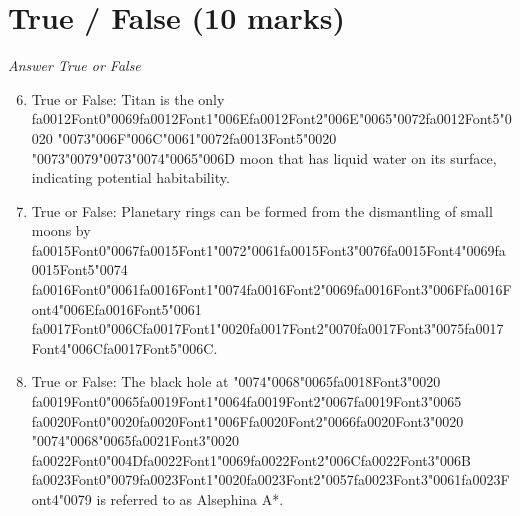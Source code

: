 \documentclass[12pt]{article}
\begin{document}
\section*{True / False (10 marks)}
\textit{Answer True or False}
\begin{enumerate}[label=\arabic*.]
\setcounter{enumi}{5}
\item True or False: Titan is the only {\csname fa0012Font0\endcsname\char"0069}{\csname fa0012Font1\endcsname\char"006E}{\csname fa0012Font2\endcsname\char"006E}{\char"0065}{\char"0072}{\csname fa0012Font5\endcsname\char"0020} {\char"0073}{\char"006F}{\char"006C}{\char"0061}{\char"0072}{\csname fa0013Font5\endcsname\char"0020} {\char"0073}{\char"0079}{\char"0073}{\char"0074}{\char"0065}{\char"006D} moon that has liquid water on its surface, indicating potential habitability.
\item True or False: Planetary rings can be formed from the dismantling of small moons by {\csname fa0015Font0\endcsname\char"0067}{\csname fa0015Font1\endcsname\char"0072}{\char"0061}{\csname fa0015Font3\endcsname\char"0076}{\csname fa0015Font4\endcsname\char"0069}{\csname fa0015Font5\endcsname\char"0074} {\csname fa0016Font0\endcsname\char"0061}{\csname fa0016Font1\endcsname\char"0074}{\csname fa0016Font2\endcsname\char"0069}{\csname fa0016Font3\endcsname\char"006F}{\csname fa0016Font4\endcsname\char"006E}{\csname fa0016Font5\endcsname\char"0061} {\csname fa0017Font0\endcsname\char"006C}{\csname fa0017Font1\endcsname\char"0020}{\csname fa0017Font2\endcsname\char"0070}{\csname fa0017Font3\endcsname\char"0075}{\csname fa0017Font4\endcsname\char"006C}{\csname fa0017Font5\endcsname\char"006C}.
\item True or False: The black hole at {\char"0074}{\char"0068}{\char"0065}{\csname fa0018Font3\endcsname\char"0020} {\csname fa0019Font0\endcsname\char"0065}{\csname fa0019Font1\endcsname\char"0064}{\csname fa0019Font2\endcsname\char"0067}{\csname fa0019Font3\endcsname\char"0065} {\csname fa0020Font0\endcsname\char"0020}{\csname fa0020Font1\endcsname\char"006F}{\csname fa0020Font2\endcsname\char"0066}{\csname fa0020Font3\endcsname\char"0020} {\char"0074}{\char"0068}{\char"0065}{\csname fa0021Font3\endcsname\char"0020} {\csname fa0022Font0\endcsname\char"004D}{\csname fa0022Font1\endcsname\char"0069}{\csname fa0022Font2\endcsname\char"006C}{\csname fa0022Font3\endcsname\char"006B} {\csname fa0023Font0\endcsname\char"0079}{\csname fa0023Font1\endcsname\char"0020}{\csname fa0023Font2\endcsname\char"0057}{\csname fa0023Font3\endcsname\char"0061}{\csname fa0023Font4\endcsname\char"0079} is referred to as Alsephina A*.

\end{enumerate}
\end{document}
